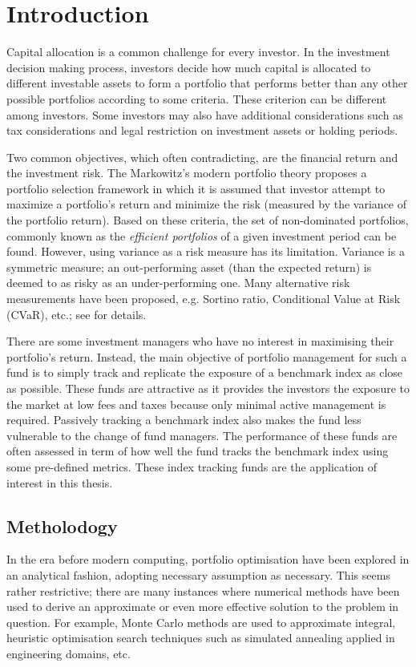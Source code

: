 \chapter{Introduction}
\graphicspath{{Chapter1/figures/}}
\label{Introduction}
Capital allocation is a common challenge for every investor. In the investment decision making process, investors decide how much capital is allocated to different investable assets to form a portfolio that performs better than any other possible portfolios according to some criteria. These criterion can be different among investors. Some investors may also have additional considerations such as tax considerations and legal restriction on investment assets or holding periods.

Two common objectives, which often contradicting, are the financial return and the investment risk. The Markowitz's modern portfolio theory \cite{HM52} proposes a portfolio selection framework in which it is assumed that investor attempt to maximize a portfolio's return and minimize the risk (measured by the variance of the portfolio return). Based on these criteria, the set of non-dominated portfolios, commonly known as the \emph{efficient portfolios} of a given investment period can be found. However, using variance as a risk measure has its limitation. Variance is a symmetric measure; an out-performing asset (than the expected return) is deemed to as risky as an under-performing one. Many alternative risk measurements have been proposed, e.g. Sortino ratio, Conditional Value at Risk (CVaR), etc.; see \cite{RTR00} for details.

There are some investment managers who have no interest in maximising their portfolio's return. Instead, the main objective of portfolio management for such a fund is to simply track and replicate the exposure of a benchmark index as close as possible. These funds are attractive as it provides the investors the exposure to the market at low fees and taxes because only minimal active management is required. Passively tracking a benchmark index also makes the fund less vulnerable to the change of fund managers. The performance of these funds are often assessed in term of how well the fund tracks the benchmark index using some pre-defined metrics. These index tracking funds are the application of interest in this thesis.

\section{Metholodogy}
In the era before modern computing, portfolio optimisation have been explored in an analytical fashion, adopting necessary assumption as necessary. This seems rather restrictive; there are many instances where numerical methods have been used to derive an approximate or even more effective solution to the problem in question. For example, Monte Carlo methods are used to approximate integral, heuristic optimisation search techniques such as simulated annealing applied in engineering domains, etc.

